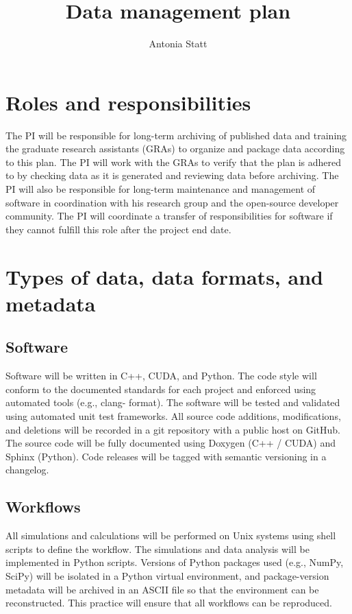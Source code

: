 \documentclass{article}
\title{Data management plan}
\author{Antonia Statt}
\begin{document}
\maketitle

\section{Roles and responsibilities}
The PI will be responsible for long-term archiving of published data and training the graduate
research assistants (GRAs) to organize and package data according to this plan. 
The PI will work with the GRAs to verify that the plan is adhered to by checking data as it is generated 
and reviewing data before archiving. The PI will
also be responsible for long-term maintenance and management of software in coordination with
his research group and the open-source developer community. The PI will coordinate a transfer of
responsibilities for software if they cannot fulfill this role after the project end date.

\section{Types of data, data formats, and metadata}

\subsection{Software}
 Software will be written in C++, CUDA, and Python. The code style will conform to
the documented standards for each project and enforced using automated tools (e.g., clang-
format). The software will be tested and validated using automated unit test frameworks. All
source code additions, modifications, and deletions will be recorded in a git repository with a
public host on GitHub. The source code will be fully documented using Doxygen (C++ / CUDA)
and Sphinx (Python). Code releases will be tagged with semantic versioning in a changelog.

\subsection{Workflows}
All simulations and calculations will be performed on Unix systems using shell
scripts to define the workflow. The simulations and data analysis will be implemented in Python
scripts. Versions of Python packages used (e.g., NumPy, SciPy) will be isolated in a Python virtual
environment, and package-version metadata will be archived in an ASCII file so that the
environment can be reconstructed. This practice will ensure that all workflows can be reproduced.
\end{document}
